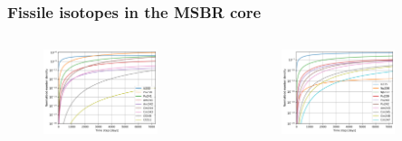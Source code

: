 \documentclass[9pt,handout]{beamer}
\begin{document}
\begin{frame}
  \frametitle{Fissile isotopes in the \gls{MSBR} core}
  \begin{columns}
    \column[t]{6cm}
               \begin{figure}[t]
                \vspace*{-0.1in}
                \includegraphics[height=0.75\textwidth]{./images/fissile_short.png}
               \end{figure}
    \column[t]{6cm}
               \begin{figure}[t]
                \vspace*{-0.1in}
                \includegraphics[height=0.75\textwidth]{./images/fissile_long.png}
               \end{figure}
    \end{columns}              
\end{frame}
\end{document}
